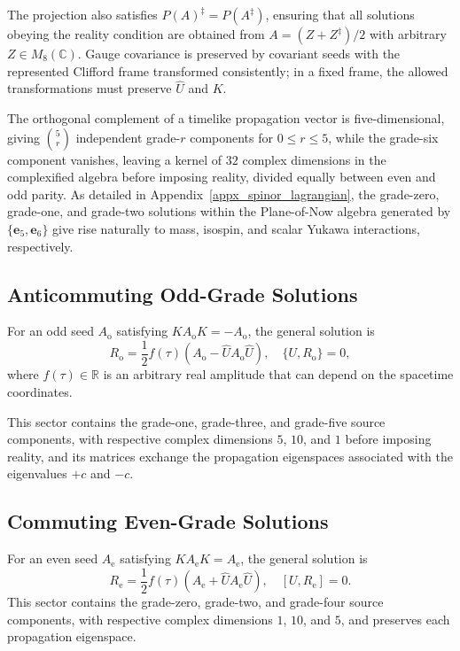 The projection also satisfies $P(A)^{\ddagger}=P(A^{\ddagger})$, ensuring that all solutions obeying the reality condition are obtained from $A=(Z+Z^{\ddagger})/2$ with arbitrary $Z\in M_8(\mathbb{C})$. Gauge covariance is preserved by covariant seeds with the represented Clifford frame transformed consistently; in a fixed frame, the allowed transformations must preserve $\hat{U}$ and $K$.

The orthogonal complement of a timelike propagation vector is five-dimensional, giving $\binom{5}{r}$ independent grade-$r$ components for $0\leq r\leq5$, while the grade-six component vanishes, leaving a kernel of $32$ complex dimensions in the complexified algebra before imposing reality, divided equally between even and odd parity. As detailed in Appendix~\ref{appx_spinor_lagrangian}, the grade-zero, grade-one, and grade-two solutions within the Plane-of-Now algebra generated by $\{\mathbf{e}_{5},\mathbf{e}_{6}\}$ give rise naturally to mass, isospin, and scalar Yukawa interactions, respectively.

\subsection{Anticommuting Odd-Grade Solutions}
For an odd seed $A_{\mathrm{o}}$ satisfying $KA_{\mathrm{o}}K=-A_{\mathrm{o}}$, the general solution is
\begin{equation}\label{eq_odd_matrix_source}
    R_{\mathrm{o}}=\frac{1}{2}f(\tau)\left(A_{\mathrm{o}}-\hat{U}A_{\mathrm{o}}\hat{U}\right),\quad \{U,R_{\mathrm{o}}\}=0,
\end{equation}
where $f(\tau) \in \mathbb{R}$ is an arbitrary real amplitude that can depend on the spacetime coordinates.

This sector contains the grade-one, grade-three, and grade-five source components, with respective complex dimensions $5$, $10$, and $1$ before imposing reality, and its matrices exchange the propagation eigenspaces associated with the eigenvalues $+c$ and $-c$.

\subsection{Commuting Even-Grade Solutions}
For an even seed $A_{\mathrm{e}}$ satisfying $KA_{\mathrm{e}}K=A_{\mathrm{e}}$, the general solution is
\begin{equation}\label{eq_even_matrix_source}
    R_{\mathrm{e}}=\frac{1}{2}f(\tau)\left(A_{\mathrm{e}}+\hat{U}A_{\mathrm{e}}\hat{U}\right),\quad [U,R_{\mathrm{e}}]=0.
\end{equation}
This sector contains the grade-zero, grade-two, and grade-four source components, with respective complex dimensions $1$, $10$, and $5$, and preserves each propagation eigenspace.

